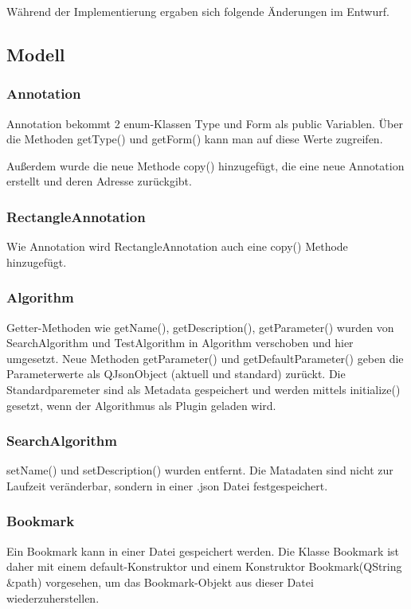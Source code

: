 Während der Implementierung ergaben sich folgende Änderungen im Entwurf.

\subsection{Modell}
\subsubsection{Annotation}
Annotation bekommt 2 enum-Klassen Type und Form als public Variablen. Über die Methoden getType() und getForm() kann man auf diese Werte zugreifen.

Außerdem wurde die neue Methode copy() hinzugefügt, die eine neue Annotation erstellt und deren Adresse zurückgibt. 

\subsubsection{RectangleAnnotation}
Wie Annotation wird RectangleAnnotation auch eine copy() Methode hinzugefügt.

\subsubsection{Algorithm}
Getter-Methoden wie getName(), getDescription(), getParameter() wurden von SearchAlgorithm und TestAlgorithm in Algorithm verschoben und hier umgesetzt.
Neue Methoden getParameter() und getDefaultParameter() geben die Parameterwerte als QJsonObject (aktuell und standard) zurückt. Die Standardparemeter sind als Metadata gespeichert und werden mittels initialize() gesetzt, wenn der Algorithmus als Plugin geladen wird.

\subsubsection{SearchAlgorithm}
setName() und setDescription() wurden entfernt. Die Matadaten sind nicht zur Laufzeit veränderbar, sondern in einer .json Datei festgespeichert.

\subsubsection{Bookmark}
Ein Bookmark kann in einer Datei gespeichert werden. Die Klasse Bookmark ist daher mit einem default-Konstruktor und einem Konstruktor Bookmark(QString &path) vorgesehen, um das Bookmark-Objekt aus dieser Datei wiederzuherstellen.

